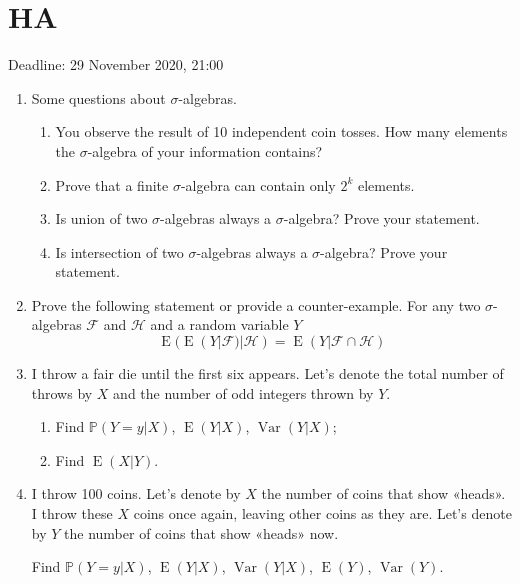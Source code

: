 \documentclass[12pt]{article}
\DeclareMathOperator{\Var}{Var}
\DeclareMathOperator{\E}{E}
\def \P{\mathbb{P}}
\begin{document}
\section{HA}


Deadline: 29 November 2020, 21:00

\begin{enumerate}

\item Some questions about $\sigma$-algebras. 
\begin{enumerate}
  \item You observe the result of 10 independent coin tosses. How many elements the $\sigma$-algebra of your information contains?
  \item Prove that a finite $\sigma$-algebra can contain only $2^k$ elements.
  \item Is union of two $\sigma$-algebras always a $\sigma$-algebra? Prove your statement.
  \item Is intersection of two $\sigma$-algebras always a $\sigma$-algebra? Prove your statement.
\end{enumerate}

\item Prove the following statement or provide a counter-example.
For any two $\sigma$-algebras $\mathcal{F}$ and $\mathcal{H}$ and a random variable $Y$
\[
  \E(\E(Y|\mathcal F)|\mathcal H) = \E(Y|\mathcal F \cap \mathcal H)
\]

\item I throw a fair die until the first six appears. 
Let's denote the total number of throws by $X$ and the number of odd integers thrown by $Y$.

\begin{enumerate}
  \item Find $\P(Y=y|X)$, $\E(Y|X)$, $\Var(Y|X)$;
  \item Find $\E(X|Y)$.
\end{enumerate}

\item I throw 100 coins. Let's denote by $X$ the number of coins that show «heads».
I throw these $X$ coins once again, leaving other coins as they are. 
Let's denote by $Y$ the number of coins that show «heads» now.

Find $\P(Y=y|X)$, $\E(Y|X)$, $\Var(Y|X)$, $\E(Y)$, $\Var(Y)$.




\end{enumerate}
\end{document}
